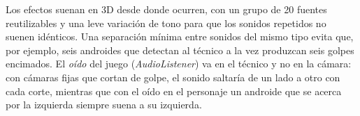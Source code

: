 Los efectos suenan en 3D desde donde ocurren, con un grupo de 20 fuentes reutilizables y una leve
variación de tono para que los sonidos repetidos no suenen idénticos. Una separación mínima entre
sonidos del mismo tipo evita que, por ejemplo, seis androides que detectan al técnico a la vez
produzcan seis golpes encimados. El \textit{oído} del juego (\textit{AudioListener}) va en el
técnico y no en la cámara: con cámaras fijas que cortan de golpe, el sonido saltaría de un lado a
otro con cada corte, mientras que con el oído en el personaje un androide que se acerca por la
izquierda siempre suena a su izquierda.
